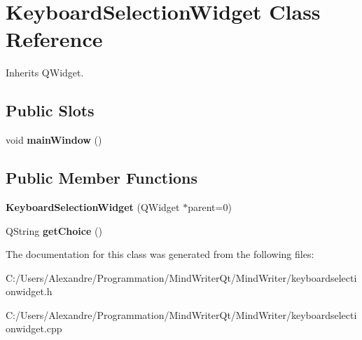 \hypertarget{class_keyboard_selection_widget}{\section{Keyboard\-Selection\-Widget Class Reference}
\label{class_keyboard_selection_widget}
}


Inherits Q\-Widget.

\subsection*{Public Slots}
\begin{DoxyCompactItemize}
\item 
\hypertarget{class_keyboard_selection_widget_a3f192673a4541d7746e3c0835fd6e838}{void {\bfseries main\-Window} ()}\label{class_keyboard_selection_widget_a3f192673a4541d7746e3c0835fd6e838}

\end{DoxyCompactItemize}
\subsection*{Public Member Functions}
\begin{DoxyCompactItemize}
\item 
\hypertarget{class_keyboard_selection_widget_aa4e345252c736d328bf252d4dd6a4159}{{\bfseries Keyboard\-Selection\-Widget} (Q\-Widget $\ast$parent=0)}\label{class_keyboard_selection_widget_aa4e345252c736d328bf252d4dd6a4159}

\item 
\hypertarget{class_keyboard_selection_widget_a579133116ecb9a8cc48a22c445a6fc06}{Q\-String {\bfseries get\-Choice} ()}\label{class_keyboard_selection_widget_a579133116ecb9a8cc48a22c445a6fc06}

\end{DoxyCompactItemize}


The documentation for this class was generated from the following files\-:\begin{DoxyCompactItemize}
\item 
C\-:/\-Users/\-Alexandre/\-Programmation/\-Mind\-Writer\-Qt/\-Mind\-Writer/keyboardselectionwidget.\-h\item 
C\-:/\-Users/\-Alexandre/\-Programmation/\-Mind\-Writer\-Qt/\-Mind\-Writer/keyboardselectionwidget.\-cpp\end{DoxyCompactItemize}
